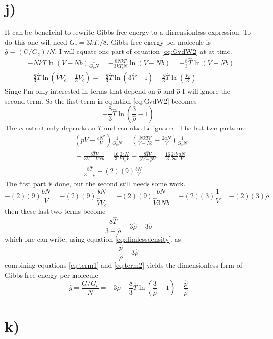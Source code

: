 \documentclass{article}
\begin{document}
\section*{j)}
It can be beneficial to rewrite Gibbs free energy to a dimensionless expression. To do this one will need $G_c = 3kT_c/8$. Gibbs free energy per molecule is $\hat{g} = (G/G_c)/N$. I will equate one part of equation \ref{eq:GvdW2} at at time.
\begin{align*}
& -NkT\ln (V-Nb) \frac{1}{G_cN} = -\frac{8NkT}{3kT_cN}\ln (V-Nb) = -\frac{8}{3} \hat{T}\ln(V-Nb) \\
& -\frac{8}{3}\hat{T} \ln (\hat{V}V_c - \frac{1}{3}V_c) = -\frac{8}{3}\hat{T} \ln (3\hat{V}-1) - \frac{8}{3}\hat{T}\ln(\frac{V_c}{3})
\end{align*}
Singe I'm only interested in terms that depend on $\hat{p}$ and $\hat{\rho}$ I will ignore the second term. So the first term in equation \ref{eq:GvdW2} becomes
\begin{equation}
\label{eq:term1}
-\frac{8}{3}\hat{T}\ln \left(\frac{3}{\hat{\rho}}-1 \right)
\end{equation}
The constant only depends on $T$ and can also be ignored. The last two parts are
\begin{align*}
&\left(pV - \frac{aN^2}{V} \right) \frac{1}{G_c N}= \left(\frac{NkTV}{V-Nb} - \frac{2aN}{V} \right) \frac{1}{G_c N} \\
&= \frac{8\hat{T}V}{3V-VNb} - \frac{16}{3}\frac{2aN}{kT_cV} = \frac{8\hat{T}V}{3V-\hat{\rho}V} -\frac{16}{3}\frac{27b}{8a}\frac{aN}{V} \\
&=\frac{8\hat{T}}{3-\hat{\rho}} - (2)(9)\frac{bN}{V}
\end{align*}
The first part is done, but the second still needs some work.
\begin{equation*}
- (2)(9)\frac{bN}{V} = - (2)(9)\frac{bN}{\hat{V}V_c} = - (2)(9)\frac{bN}{\hat{V}3Nb}= - (2)(3)\frac{1}{V} = -(2)(3) \hat{\rho}
\end{equation*}
then these last two terms become 
\begin{equation*}
\frac{8\hat{T}}{3-\hat{\rho}} - 3\hat{\rho} - 3\hat{\rho}
\end{equation*}
which one can write, using equation \ref{eq:dimlessdensity}, as
\begin{equation}
\label{eq:term2}
\frac{\hat{p}}{\hat{\rho}} - 3\hat{\rho}
\end{equation}
combining equations \ref{eq:term1} and \ref{eq:term2} yields the dimensionless form of Gibbs free energy per molecule
\begin{equation}
\hat{g} = \frac{G/G_c}{N} = -3\hat{\rho} -\frac{8}{3}\hat{T}\ln \left( \frac{3}{\hat{\rho}} - 1 \right) + \frac{\hat{p}}{\hat{\rho}}
\end{equation}

\section*{k)}
\end{document}
